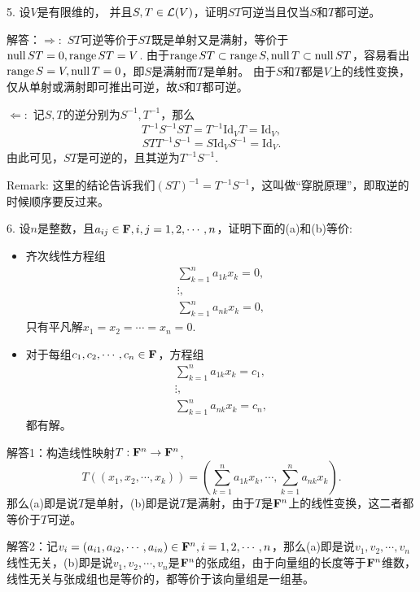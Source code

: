 \documentclass[hyperref,]{ctexart}
\begin{document}
\bigskip

\noindent{}5. 设\(V\)是有限维的，
并且\(S,T\in \mathcal{L}(V)\)，证明\(ST\)可逆当且仅当\(S\)和\(T\)都可逆。

\smallskip

\noindent{}解答：\(\Rightarrow:\)
\(ST\)可逆等价于\(ST\)既是单射又是满射，等价于\(\mathrm{null}\, ST={0},\mathrm{range}\, ST=V\).
由于\(\mathrm{range}\, ST\subset \mathrm{range}\, S,\mathrm{null}\, T\subset \mathrm{null}\, ST\)，容易看出\(\mathrm{range}\, S=V,\mathrm{null}\, T={0}\)，即\(S\)是满射而\(T\)是单射。
由于\(S\)和\(T\)都是\(V\)上的线性变换，仅从单射或满射即可推出可逆，故\(S\)和\(T\)都可逆。

\(\Leftarrow:\) 记\(S,T\)的逆分别为\(S^{-1},T^{-1}\)，那么
\[T^{-1}S^{-1}ST = T^{-1}\mathrm{Id}_VT = \mathrm{Id}_V,\]
\[STT^{-1}S^{-1} = S\mathrm{Id}_VS^{-1} = \mathrm{Id}_V.\]
由此可见，\(ST\)是可逆的，且其逆为\(T^{-1}S^{-1}\).

\noindent{}Remark:
这里的结论告诉我们\((ST)^{-1}=T^{-1}S^{-1}\)，这叫做``穿脱原理''，即取逆的时候顺序要反过来。

\bigskip

\noindent{} 6.
设\(n\)是整数，且\(a_{ij}\in\mathbf{F},i,j=1,2,\cdots,n\)，证明下面的(a)和(b)等价:

\begin{itemize}
\item
  齐次线性方程组 \[\begin{aligned}
  \sum_{k=1}^na_{1k}x_k=0,\\
  \vdots,\\
  \sum_{k=1}^na_{nk}x_k=0,
  \end{aligned}\] 只有平凡解\(x_1=x_2=\cdots=x_n=0\).
\item
  对于每组\(c_1,c_2,\cdots,c_n\in \mathbf{F}\)，方程组 \[\begin{aligned}
  \sum_{k=1}^na_{1k}x_k=c_1,\\
  \vdots,\\
  \sum_{k=1}^na_{nk}x_k=c_n,
  \end{aligned}\] 都有解。
\end{itemize}

\smallskip

\noindent{}解答1：构造线性映射\(T:\mathbf{F}^n\rightarrow \mathbf{F}^n\),
\[T((x_1,x_2,\cdots,x_k)) = (\sum_{k=1}^na_{1k}x_k,\cdots,\sum_{k=1}^na_{nk}x_k).\]
那么(a)即是说\(T\)是单射，(b)即是说\(T\)是满射，由于\(T\)是\(\mathbf{F}^n\)上的线性变换，这二者都等价于\(T\)可逆。

\noindent{}解答2：记\(v_i = (a_{i1},a_{i2},\cdots,a_{in})\in \mathbf{F}^n, i=1,2,\cdots,n\)，那么(a)即是说\(v_1,v_2,\cdots,v_n\)线性无关，(b)即是说\(v_1,v_2,\cdots,v_n\)是\(\mathbf{F}^n\)的张成组，由于向量组的长度等于\(\mathbf{F}^n\)维数，线性无关与张成组也是等价的，都等价于该向量组是一组基。
\end{document}
